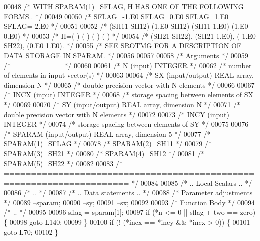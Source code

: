 \begin{DoxyCode}
00048 \textcolor{comment}{/*     WITH SPARAM(1)=SFLAG, H HAS ONE OF THE FOLLOWING FORMS.. */}
00049 
00050 \textcolor{comment}{/*     SFLAG=-1.E0     SFLAG=0.E0        SFLAG=1.E0     SFLAG=-2.E0 */}
00051 
00052 \textcolor{comment}{/*       (SH11  SH12)    (1.E0  SH12)    (SH11  1.E0)    (1.E0  0.E0) */}
00053 \textcolor{comment}{/*     H=(          )    (          )    (          )    (          ) */}
00054 \textcolor{comment}{/*       (SH21  SH22),   (SH21  1.E0),   (-1.E0 SH22),   (0.E0  1.E0). */}
00055 \textcolor{comment}{/*     SEE  SROTMG FOR A DESCRIPTION OF DATA STORAGE IN SPARAM. */}
00056 
00057 
00058 \textcolor{comment}{/*  Arguments */}
00059 \textcolor{comment}{/*  ========= */}
00060 
00061 \textcolor{comment}{/*  N      (input) INTEGER */}
00062 \textcolor{comment}{/*         number of elements in input vector(s) */}
00063 
00064 \textcolor{comment}{/*  SX     (input/output) REAL array, dimension N */}
00065 \textcolor{comment}{/*         double precision vector with N elements */}
00066 
00067 \textcolor{comment}{/*  INCX   (input) INTEGER */}
00068 \textcolor{comment}{/*         storage spacing between elements of SX */}
00069 
00070 \textcolor{comment}{/*  SY     (input/output) REAL array, dimension N */}
00071 \textcolor{comment}{/*         double precision vector with N elements */}
00072 
00073 \textcolor{comment}{/*  INCY   (input) INTEGER */}
00074 \textcolor{comment}{/*         storage spacing between elements of SY */}
00075 
00076 \textcolor{comment}{/*  SPARAM (input/output)  REAL array, dimension 5 */}
00077 \textcolor{comment}{/*     SPARAM(1)=SFLAG */}
00078 \textcolor{comment}{/*     SPARAM(2)=SH11 */}
00079 \textcolor{comment}{/*     SPARAM(3)=SH21 */}
00080 \textcolor{comment}{/*     SPARAM(4)=SH12 */}
00081 \textcolor{comment}{/*     SPARAM(5)=SH22 */}
00082 
00083 \textcolor{comment}{/*  ===================================================================== */}
00084 
00085 \textcolor{comment}{/*     .. Local Scalars .. */}
00086 \textcolor{comment}{/*     .. */}
00087 \textcolor{comment}{/*     .. Data statements .. */}
00088     \textcolor{comment}{/* Parameter adjustments */}
00089     --sparam;
00090     --sy;
00091     --sx;
00092 
00093     \textcolor{comment}{/* Function Body */}
00094 \textcolor{comment}{/*     .. */}
00095 
00096     sflag = sparam[1];
00097     \textcolor{keywordflow}{if} (*n <= 0 || sflag + two == zero) \{
00098     \textcolor{keywordflow}{goto} L140;
00099     \}
00100     \textcolor{keywordflow}{if} (! (*incx == *incy && *incx > 0)) \{
00101     \textcolor{keywordflow}{goto} L70;
00102     \}

\end{DoxyCode}
